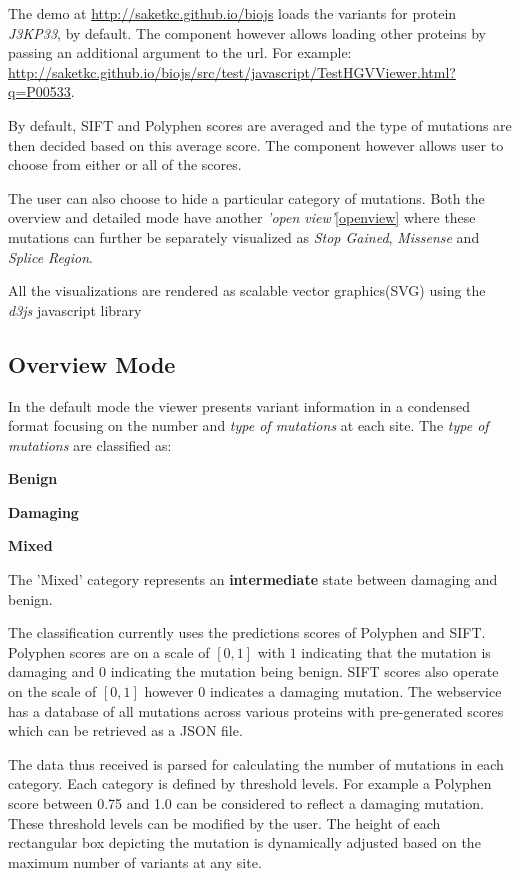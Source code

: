 \documentclass[twoside]{article}
\begin{document}
\begin{multicols}{2}
The demo at \url{http://saketkc.github.io/biojs} loads the variants for protein \textit{J3KP33}, by default. The component however allows loading other proteins by passing an additional argument to the url. For example: \url{http://saketkc.github.io/biojs/src/test/javascript/TestHGVViewer.html?q=P00533}.

By default, SIFT and Polyphen scores are averaged and the type of mutations are then decided based on this average score. The component however allows user to choose from either or all of the scores.

The user can also choose to hide a particular category of mutations. Both the overview and detailed mode have another \textit{'open view'}\ref{openview} where these mutations can further be separately visualized as \textit{Stop Gained}, \textit{Missense} and \textit{Splice Region}.

All the visualizations are rendered as scalable vector graphics(SVG) using the \textit{d3js}\cite{d3js} javascript library


\subsection{Overview Mode}
In the default mode the viewer presents variant information in a condensed format focusing on the number and \textit{type of mutations} at each site. The \textit{type of mutations} are classified as:
\begin{compactitem}
\item \textbf{Benign} %
\item \textbf{Damaging} %
\item \textbf{Mixed}
\end{compactitem}

The 'Mixed' category represents an \textbf{intermediate} state between damaging and benign.


The classification currently uses the predictions scores of Polyphen\cite{Ramensky2002} and SIFT\cite{Kumar2009}. Polyphen scores are on a scale of $[0,1]$ with $1$ indicating that the mutation is damaging and $0$ indicating the mutation being benign. SIFT scores also operate on the scale of $[0,1]$ however $0$ indicates a damaging mutation.
The webservice has a database of all mutations across various proteins with pre-generated scores which can be retrieved as a JSON file.

The data thus received is parsed for calculating the number of mutations in each category. Each category is defined by threshold levels. For example a Polyphen score between 0.75 and 1.0 can be considered to reflect a damaging mutation. These threshold levels can be modified by the user. The height of each rectangular box depicting the mutation is dynamically adjusted based on the maximum number of variants at any site.


\end{multicols}
\end{document}
